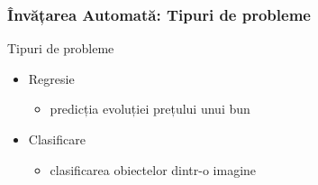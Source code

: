 \begin{frame}[t]
  \frametitle{Învățarea Automată: Tipuri de probleme}
  \begin{block}{Tipuri de probleme}
    \begin{itemize}
    \item Regresie
      \begin{itemize}
      \item predicția evoluției prețului unui bun
      \end{itemize}%
      \item Clasificare
        \begin{itemize}
        \item clasificarea obiectelor dintr-o imagine
        \end{itemize}
    \end{itemize}
  \end{block}%
  \begin{center}

\end{center}
\end{frame}
